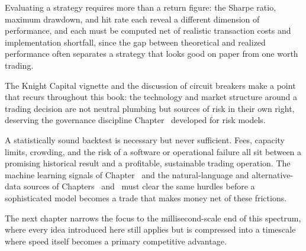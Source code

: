 \documentclass[../ai_in_finance]{subfiles}
\begin{document}
Evaluating a strategy requires more than a return figure: the Sharpe ratio, maximum drawdown, and hit rate each reveal a different dimension of performance, and each must be computed net of realistic transaction costs and implementation shortfall, since the gap between theoretical and realized performance often separates a strategy that looks good on paper from one worth trading.

The Knight Capital vignette and the discussion of circuit breakers make a point that recurs throughout this book: the technology and market structure around a trading decision are not neutral plumbing but sources of risk in their own right, deserving the governance discipline Chapter~ developed for risk models.

A statistically sound backtest is necessary but never sufficient. Fees, capacity limits, crowding, and the risk of a software or operational failure all sit between a promising historical result and a profitable, sustainable trading operation. The machine learning signals of Chapter~ and the natural-language and alternative-data sources of Chapters~ and~ must clear the same hurdles before a sophisticated model becomes a trade that makes money net of these frictions.

The next chapter narrows the focus to the millisecond-scale end of this spectrum, where every idea introduced here still applies but is compressed into a timescale where speed itself becomes a primary competitive advantage.

\end{document}
